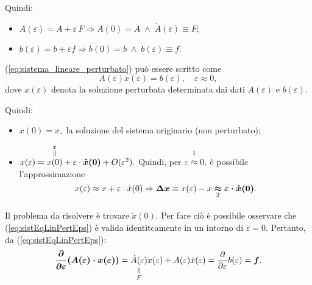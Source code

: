 Quindi:
\begin{itemize}
    \item $A(\varepsilon)=A+\varepsilon\, F \Rightarrow A(0)=A\;\wedge\; \dot A(\varepsilon)\equiv F;$
    \item  $b(\varepsilon)=b+\varepsilon f\Rightarrow b(0)=b\; \wedge\; \dot{b}(\varepsilon)\equiv f.$
\end{itemize}

\noindent(\ref{eq:sistema_lineare_perturbato}) può essere scritto come
\begin{equation}\label{eq:sistEqLinPertEps}
    A(\varepsilon) x(\varepsilon)= b(\varepsilon),\quad \varepsilon\approx 0,
\end{equation}
dove $x(\varepsilon)$ denota la soluzione perturbata determinata dai dati $A(\varepsilon)$ e $b(\varepsilon)$.

Quindi:
\begin{itemize}
    \item $x(0)=x,$ la soluzione del sistema originario (non perturbato);
    \item $x(\varepsilon)=\equaltoup{x(0)}{x}+\varepsilon\cdot\boldsymbol{\dot x(0)}+O(\varepsilon^2).$ Quindi, per $\overset{\footnotemark}{\varepsilon\approx 0},$ è possibile l'approssimazione
    \begin{equation*}
        x(\varepsilon)\approx x+\varepsilon\cdot\dot x(0)\Rightarrow\boldsymbol{\Delta x}\equiv x(\varepsilon)-x\underset{\footnotemark}{\boldsymbol\approx}\boldsymbol{\varepsilon\cdot\dot x(0)}.
    \end{equation*}

\end{itemize}

\addtocounter{footnote}{-1}


Il problema da risolvere è trovare $\dot x(0)$. Per fare ciò è possibile osservare che (\ref{eq:sistEqLinPertEps}) è valida identitcamente in un intorno di $\varepsilon=0.$ Pertanto, da (\ref{eq:sistEqLinPertEps}):
\begin{equation*}
   \boldsymbol{\frac{\partial}{\partial\varepsilon}(A(\varepsilon)\cdot x(\varepsilon))}=\equalto{\dot A(\varepsilon)}{F}x(\varepsilon) + A(\varepsilon)\dot x(\varepsilon)=\frac{\partial}{\partial\varepsilon} b(\varepsilon)=\boldsymbol f.
\end{equation*}

